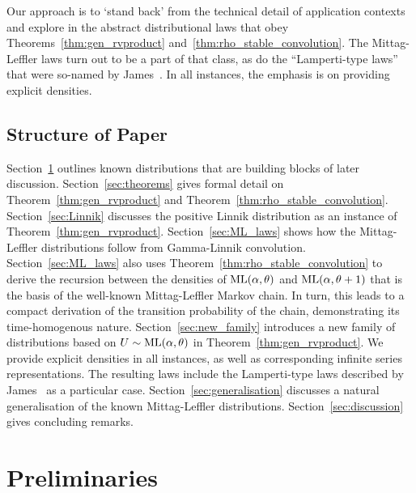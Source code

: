 \documentclass[a4paper,12pt]{article}
\begin{document}
{ Our approach is to `stand back' from the technical detail of  application contexts and explore in the abstract distributional laws that obey
 Theorems~\ref{thm:gen_rvproduct} and~\ref{thm:rho_stable_convolution}.
 The Mittag-Leffler laws turn out to be a part of that class, as do  the  ``Lamperti-type laws'' that were so-named by James~\cite{James_Lamperti}.
  In all instances, the emphasis is on providing explicit densities. %

\subsection{Structure of Paper}
\label{sec:structure}

Section~\ref{sec:prelim} outlines known distributions that are building blocks of later discussion.
Section~\ref{sec:theorems} gives formal detail on  Theorem~\ref{thm:gen_rvproduct}  and Theorem~\ref{thm:rho_stable_convolution}.
Section~\ref{sec:Linnik} discusses the  positive  Linnik distribution
as an instance of  Theorem~\ref{thm:gen_rvproduct}.
Section~\ref{sec:ML_laws} shows how the  Mittag-Leffler distributions follow   from  Gamma-Linnik  convolution. 
 Section~\ref{sec:ML_laws} also uses Theorem~\ref{thm:rho_stable_convolution} to derive  the recursion between the densities of
 ${\rm ML(\alpha,\theta})$ and ${\rm ML(\alpha,\theta+1})$ that is  the basis of the well-known Mittag-Leffler Markov chain.
In turn, this leads to a compact derivation of the transition probability of the chain, demonstrating its time-homogenous nature. 
Section~\ref{sec:new_family} introduces a new family of distributions  based on 
$U\sim {\rm ML(\alpha,\theta})$ in Theorem~\ref{thm:gen_rvproduct}. 
We  provide explicit densities in all instances, as well as  corresponding infinite series representations.
The resulting laws include the Lamperti-type laws described by James~\cite{James_Lamperti} as a particular case.
Section~\ref{sec:generalisation} discusses a natural  generalisation of the known Mittag-Leffler distributions.
Section~\ref{sec:discussion} gives concluding remarks.

\section{Preliminaries}
\label{sec:prelim}

}
\end{document}
